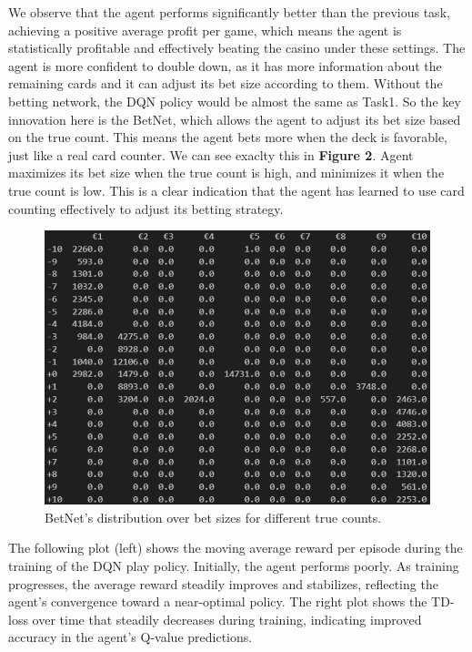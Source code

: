 \documentclass{article}
\begin{document}
\noindent We observe that the agent performs significantly better than the previous
task, achieving a positive average profit per game, which means the agent is 
statistically profitable and effectively beating the casino under these settings.
\noindent The agent is more confident to double down, as it has more information
about the remaining cards and it can adjust its bet size according to them.
Without the betting network, the DQN policy would be almost the same as Task1.
So the key innovation here is the BetNet, which allows the agent to adjust its bet size based on the true count.
This means the agent bets more when the deck is favorable, just like a real card counter.
We can see exaclty this in {\bf Figure 2}. Agent maximizes its bet size when the true count is high,
and minimizes it when the true count is low. This is a clear indication that the agent has learned to use card counting effectively to adjust its betting strategy.

\newpage

\begin{figure}[h!]
  \centering
  \includegraphics[width=0.7\linewidth]{Images/bettable.png}
  \caption{BetNet's distribution over bet sizes for different true counts.}
  \label{fig:betnet_distribution}
\end{figure}

\noindent The following plot (left) shows the moving average reward per episode
 during the training of the DQN play policy. Initially,
  the agent performs poorly. As training 
  progresses, the average reward steadily improves and 
  stabilizes, reflecting the agent's convergence 
  toward a near-optimal policy. The right plot shows the 
  TD-loss over time that steadily decreases during 
  training, indicating improved accuracy in the agent's
   Q-value predictions. 
\end{document}
